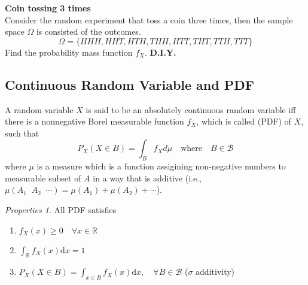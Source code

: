 \documentclass[twoside]{article}
\makeatletter
\DeclareMathOperator*{\dotcup}{\dot{\cup}}
\theoremstyle{definition}
\theoremstyle{remark}
\newtheorem{properties}[theorem]{Properties}
\theoremstyle{remark}
\newenvironment{example}
 {\patchcmd{\@thm}{\trivlist}{\list{}{\leftmargin=3em \rightmargin=3em}}{}{}%
  \vspace*{10\p@}
  \innerexample\pushQED{\hfill\ensuremath{\Diamond}}}
 {\popQED\endinnerexample}
\makeatother
\begin{document}
\begin{example}
  {\bf Coin tossing 3 times}\\
  Consider the random experiment that toss a coin three times, then the sample
  space $\Omega$ is consisted of the outcomes.
  \begin{equation*}
    \Omega = {\{ HHH, HHT, HTH, THH, HTT, THT, TTH, TTT \}}
  \end{equation*}
  Find the probability mass function $f_X$. \textbf{D.I.Y.}
\end{example}

\subsection{Continuous Random Variable and PDF}
A random variable $X$ is said to be an absolutely continuous random variable iff
there is a nonnegative Borel measurable function $f_X$, which is called
 (PDF) of $X$, such that
\begin{equation}
  P_X(X \in B) = \int_{B} f_X d\mu \quad \textrm{where} \quad B \in \mathcal{B}
\end{equation}
where $\mu$ is a measure which is a function assigining non-negative numbers to
measurable subset of $A$ in a way that is additive (i.e., $\mu(A_1 \dotcup A_2
\dotcup \cdots) = \mu(A_1) + \mu(A_2) + \cdots$).

\begin{properties}{ All PDF satisfies}
  \begin{enumerate}
    \item $f_X(x) \geq 0 \quad \forall x \in \mathbb{R}$
    \item $\int_{\mathbb{R}} f_X(x) \mathrm{d}x = 1$
    \item $P_X(X \in B) = \int_{x \in B} f_X(x) \mathrm{d}x, \quad \forall B \in \mathcal{B}$ ($\sigma$ additivity)
  \end{enumerate}
\end{properties}
\end{document}
